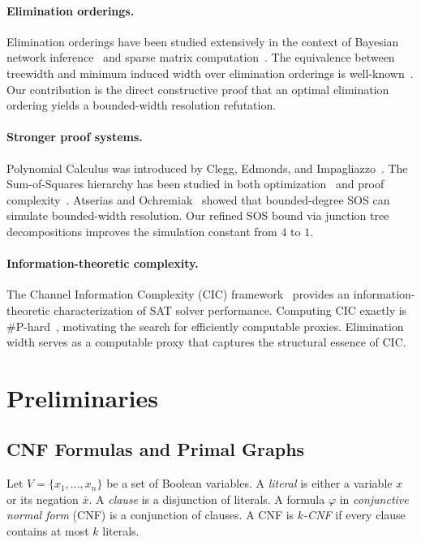 \documentclass[11pt]{article}
\begin{document}
\paragraph{Elimination orderings.} Elimination orderings have been studied extensively in the context of Bayesian network inference~\cite{dechter1999bucket} and sparse matrix computation~\cite{rose1970triangulated}. The equivalence between treewidth and minimum induced width over elimination orderings is well-known~\cite{arnborg1987complexity}. Our contribution is the direct constructive proof that an optimal elimination ordering yields a bounded-width resolution refutation.

\paragraph{Stronger proof systems.} Polynomial Calculus was introduced by Clegg, Edmonds, and Impagliazzo~\cite{CEI96}. The Sum-of-Squares hierarchy has been studied in both optimization~\cite{lasserre2001global} and proof complexity~\cite{grigoriev2001linear}. Atserias and Ochremiak~\cite{AO19} showed that bounded-degree SOS can simulate bounded-width resolution. Our refined SOS bound via junction tree decompositions improves the simulation constant from $4$ to $1$.

\paragraph{Information-theoretic complexity.} The Channel Information Complexity (CIC) framework~\cite{cic_framework} provides an information-theoretic characterization of SAT solver performance. Computing CIC exactly is \#P-hard~\cite{sharp_p_cic}, motivating the search for efficiently computable proxies. Elimination width serves as a computable proxy that captures the structural essence of CIC.

\section{Preliminaries}

\subsection{CNF Formulas and Primal Graphs}

Let $V = \{x_1, \ldots, x_n\}$ be a set of Boolean variables. A \emph{literal} is either a variable $x$ or its negation $\bar{x}$. A \emph{clause} is a disjunction of literals. A formula $\varphi$ in \emph{conjunctive normal form} (CNF) is a conjunction of clauses. A CNF is \emph{$k$-CNF} if every clause contains at most $k$ literals.
\end{document}
